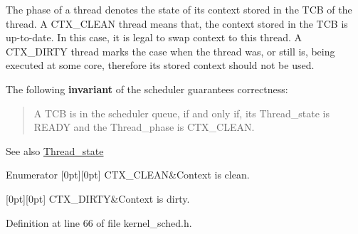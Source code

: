 The phase of a thread denotes the state of its context stored in the {\ttfamily T\+CB} of the thread. A {\ttfamily C\+T\+X\+\_\+\+C\+L\+E\+AN} thread means that, the context stored in the T\+CB is up-\/to-\/date. In this case, it is legal to swap context to this thread. A {\ttfamily C\+T\+X\+\_\+\+D\+I\+R\+TY} thread marks the case when the thread was, or still is, being executed at some core, therefore its stored context should not be used.

The following {\bfseries invariant} of the scheduler guarantees correctness\+:

\begin{quote}
A T\+CB is in the scheduler queue, if and only if, its {\ttfamily Thread\+\_\+state} is {\ttfamily R\+E\+A\+DY} and the {\ttfamily Thread\+\_\+phase} is {\ttfamily C\+T\+X\+\_\+\+C\+L\+E\+AN}. \end{quote}


\begin{DoxySeeAlso}{See also}
\hyperlink{group__scheduler_ga6c969c169777f82c104cf73e501df70f}{Thread\+\_\+state} 
\end{DoxySeeAlso}
\begin{DoxyEnumFields}{Enumerator}
[0pt][0pt]{}\mbox{\label{group__scheduler_ggab180b4aa356776bddcd724cef4f5deaeaa826daca588e692c88114586b0de472b}} 
C\+T\+X\+\_\+\+C\+L\+E\+AN&Context is clean. \\
\hline

[0pt][0pt]{}\mbox{\label{group__scheduler_ggab180b4aa356776bddcd724cef4f5deaea2b4b41fda67c1a83e6523675515c007b}} 
C\+T\+X\+\_\+\+D\+I\+R\+TY&Context is dirty. \\
\hline

\end{DoxyEnumFields}


Definition at line 66 of file kernel\+\_\+sched.\+h.

\mbox{\label{group__scheduler_ga6c969c169777f82c104cf73e501df70f}} 
